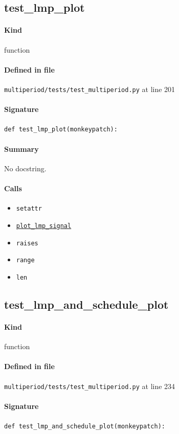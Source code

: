 \documentclass[11pt]{report}
\begin{document}
\subsection{test\_lmp\_plot}
\label{def:multiperiod-tests-test_multiperiod.py:test_lmp_plot:L201}
\paragraph{Kind} function
\paragraph{Defined in file} \texttt{multiperiod/tests/test\_multiperiod.py} at line 201
\paragraph{Signature} \texttt{def test\_lmp\_plot(monkeypatch):}
\paragraph{Summary} No docstring.
\paragraph{Calls}
\begin{itemize}[leftmargin=*]
  \item \texttt{setattr}
  \item \hyperref[def:multiperiod-multiperiod.py:MultiPeriodModel.plot_lmp_signal:L493]{\texttt{plot\_lmp\_signal}}
  \item \texttt{raises}
  \item \texttt{range}
  \item \texttt{len}
\end{itemize}
\subsection{test\_lmp\_and\_schedule\_plot}
\label{def:multiperiod-tests-test_multiperiod.py:test_lmp_and_schedule_plot:L234}
\paragraph{Kind} function
\paragraph{Defined in file} \texttt{multiperiod/tests/test\_multiperiod.py} at line 234
\paragraph{Signature} \texttt{def test\_lmp\_and\_schedule\_plot(monkeypatch):}
\end{document}
